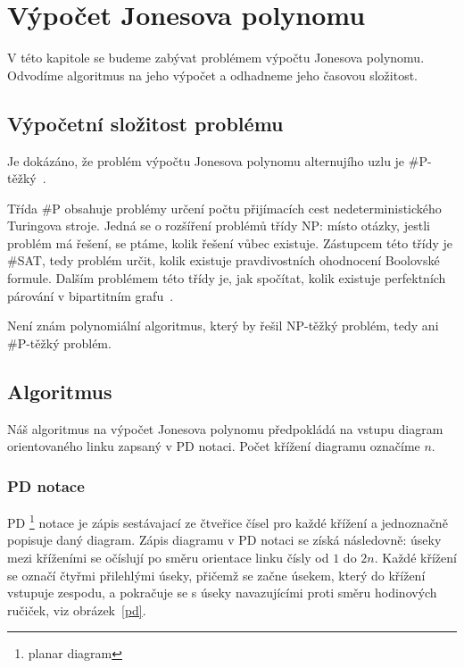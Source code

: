 \chapter{Výpočet Jonesova polynomu}

V této kapitole se budeme zabývat problémem výpočtu Jonesova polynomu. Odvodíme algoritmus na jeho výpočet a odhadneme jeho časovou složitost.

\section{Výpočetní složitost problému} 

Je dokázáno, že problém výpočtu Jonesova polynomu alternujího uzlu je \mbox{\#P-těžký}~\cite{jaeger_vertigan_welsh_1990}. 

Třída \#P obsahuje problémy určení počtu přijímacích cest nedeterministického Turingova stroje. Jedná se o rozšíření problémů třídy NP: místo otázky, jestli problém má řešení, se ptáme, kolik řešení vůbec existuje. Zástupcem této třídy je \#SAT, tedy problém určit, kolik existuje pravdivostních ohodnocení Boolovské formule. Dalším problémem této třídy je, jak spočítat, kolik  existuje perfektních párování v bipartitním grafu~\cite{zoo}.

Není znám polynomiální algoritmus, který by řešil NP-těžký problém, tedy ani \#P-těžký problém.

\section{Algoritmus}
Náš algoritmus na výpočet Jonesova polynomu předpokládá na vstupu diagram orientovaného linku zapsaný v PD notaci. Počet křížení diagramu označíme $n$.

\subsection{PD notace} 

PD \footnote{planar diagram} notace je zápis sestávajací ze čtveřice čísel pro každé křížení a jednoznačně popisuje daný diagram. Zápis diagramu v PD notaci se získá následovně: úseky mezi kříženími se očíslují po směru orientace linku čísly od $1$ do $2 n$. Každé křížení se označí čtyřmi přilehlými úseky, přičemž se začne úsekem, který do křížení vstupuje zespodu, a pokračuje se s úseky navazujícími proti směru hodinových ručiček, viz obrázek~\ref{pd}.

